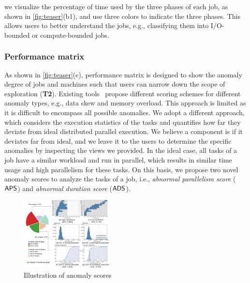 we visualize the percentage of time used by the three phases of each job, as shown in \autoref{fig:teaser}(b1), and use three colors to indicate the three phases.  
This allows users to better understand the jobs, e.g., classifying them into I/O-bounded or compute-bounded jobs.



\subsubsection{Performance matrix}\label{sec:taskmachinepair}
As shown in \autoref{fig:teaser}(c), performance matrix is designed to show the anomaly degree of jobs and machines such that users can narrow down the scope of exploration (\textbf{T2}). 
Existing tools~\cite{elephant, prometheus} propose different scoring schemes for different anomaly types, e.g., data skew and memory overload. This approach is limited as it is difficult to encompass all possible anomalies. We adopt a different approach, which considers the execution statistics of the tasks and quantifies how far they deviate from ideal distributed parallel execution. 
We believe a component is  if it deviates far from ideal, and we leave it to the users to determine the specific anomalies by inspecting the views we provided.
In the ideal case, all tasks of a job have a similar workload and run in parallel, which results in similar time usage and high parallelism for these tasks.
On this basis, we propose two novel anomaly scores to analyze the tasks of a job, i.e., \textit{abnormal parallelism score} (${\mathsf{APS}}$) and \textit{abnormal duration score} (${\mathsf{ADS}}{}$).

\begin{figure}
	\centering
	\small
	\includegraphics[width=0.42\textwidth]{figures/dataprocess/anomaly_illustration_vis2023.pdf}
	\vspace{-3mm}
	\caption{Illustration of anomaly scores}
	\label{fig:score}
	\vspace{-5mm}
\end{figure}


